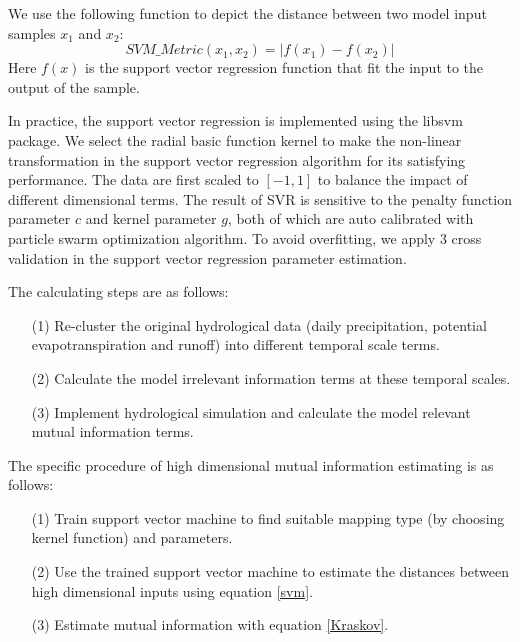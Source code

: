\documentclass[11pt]{article}
\begin{document}
We use the following function to depict the distance between two model input samples $x_1$ and $x_2$:
\begin{equation}\label{svm}
SVM\_Metric(x_1,x_2)=|f(x_1)-f(x_2)|
\end{equation}
Here $f(x)$ is the support vector regression function that fit the input to the output of the sample.   

In practice, the support vector regression is implemented using the libsvm package\cite{chang2011libsvm}.  We select the radial basic function kernel to make the non-linear transformation in the support vector regression algorithm for its satisfying performance. The data are first scaled to $[-1,1]$ to balance the impact of different dimensional terms. The result of SVR is sensitive to the penalty function parameter $c$ and kernel parameter $g$, both of which are auto calibrated with particle swarm optimization algorithm\cite{shi1998modified}. To avoid overfitting, we apply  3 cross validation in the support vector regression parameter estimation. 

The calculating steps are as follows:
 \begin{enumerate}
 \item [(1)]Re-cluster the original hydrological data (daily precipitation, potential evapotranspiration and runoff) into different temporal scale terms. 
 \item [(2)]Calculate the  model irrelevant information terms  at these temporal scales.
 \item [(3)]Implement hydrological simulation and calculate the model relevant mutual information terms.
 \end{enumerate}

The specific procedure of high dimensional mutual information estimating is as follows:
\begin{enumerate}
\item [(1)]Train support vector machine to find suitable mapping type (by choosing kernel function) and parameters.
\item [(2)]Use the trained support vector machine to estimate the distances between high dimensional inputs using equation \ref{svm}.
\item [(3)]Estimate mutual information with equation \ref{Kraskov}.
\end{enumerate}
\end{document}

